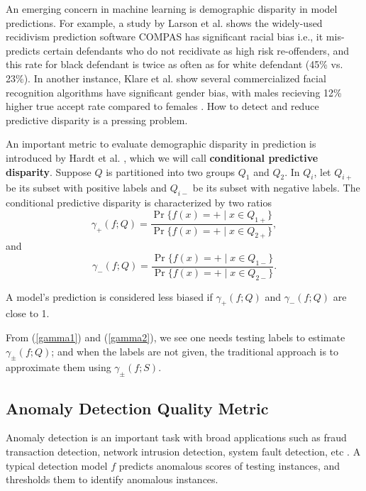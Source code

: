 An emerging concern in machine learning is demographic disparity 
in model predictions. For example, a study by Larson et al. 
\cite{larson2016} shows the widely-used recidivism prediction 
software COMPAS has significant racial bias i.e., it mis-predicts 
certain defendants who do not recidivate as high risk re-offenders, 
and this rate for black defendant is twice as often as for white defendant (45\% vs. 23\%). 
In another instance, Klare et al. show several commercialized 
facial recognition algorithms have significant gender bias, 
with males recieving 12\% higher true accept rate compared 
to females \cite{klare2012face}. How to detect and reduce 
predictive disparity is a pressing problem.

An important metric to evaluate demographic disparity in prediction 
is introduced by Hardt et al. \cite{hardt2016equality}, which we 
will call \textbf{conditional predictive disparity}. 
Suppose $Q$ is partitioned into two groups $Q_{1}$ and $Q_{2}$. 
In $Q_{i}$, let $Q_{i+}$ be its subset with positive labels and 
$Q_{i-}$ be its subset with negative labels. 
The conditional predictive disparity is characterized by two ratios 
\begin{equation}
\label{gamma1}
\gamma_{+}(f; Q) = \frac{\Pr \{ f(x) = + \mid x \in Q_{1+} 
\}}{\Pr \{ f(x) = + \mid x \in Q_{2+} \}},  
\end{equation}
and 
\begin{equation}
\label{gamma2}
\gamma_{-}(f; Q) = \frac{\Pr \{ f(x) = + \mid x 
\in Q_{1-} \}}{\Pr \{ f(x) = + \mid x \in Q_{2-} \}}.   
\end{equation}

A model's prediction is considered less biased if $\gamma_{+}(f; Q)$ 
and $\gamma_{-}(f; Q)$ are close to 1. 

From (\ref{gamma1}) and (\ref{gamma2}), we see one needs testing 
labels to estimate $\gamma_{\pm}(f; Q)$; and when the labels are 
not given, the traditional approach is to approximate them using 
$\gamma_{\pm}(f; S)$. 

\subsection{Anomaly Detection Quality Metric}

Anomaly detection is an important task with broad applications 
such as fraud transaction detection, network intrusion detection, 
system fault detection, etc \cite{chandola2009anomaly}. 
A typical detection model $f$ predicts anomalous scores of 
testing instances, and thresholds them to identify anomalous 
instances. 

